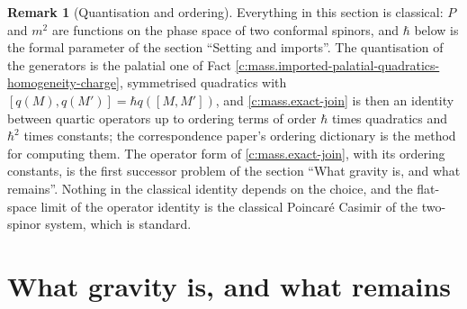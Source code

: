 \documentclass[11pt]{article}
\theoremstyle{definition}
\newtheorem{remark}[theorem]{Remark}
\theoremstyle{plain}
\newcommand{\changedmark}[2]{\marginpar{\raggedright\scriptsize\color{#1}#2}}
\begin{document}
\begin{remark}[Quantisation and ordering]\label{c:note.mass.quantisation-ordering}
\changedmark{gray}{reworded}
Everything in this section is classical: $P$ and $m^{2}$ are functions on the phase space of two conformal spinors, and $\hbar$ below is the formal parameter of the section ``Setting and imports''. The quantisation of the generators is the palatial one of Fact \ref{c:mass.imported-palatial-quadratics-homogeneity-charge}, symmetrised quadratics with $[q(M), q(M')] = \hbar q([M,M'])$, and \ref{c:mass.exact-join} is then an identity between quartic operators up to ordering terms of order $\hbar$ times quadratics and $\hbar^{2}$ times constants; the correspondence paper's ordering dictionary \cite[Thm.~5.7]{ButlerT9} is the method for computing them. The operator form of \ref{c:mass.exact-join}, with its ordering constants, is the first successor problem of the section ``What gravity is, and what remains''. Nothing in the classical identity depends on the choice, and the flat-space limit of the operator identity is the classical Poincar\'e Casimir of the two-spinor system, which is standard.
\end{remark}

\section{What gravity is, and what remains}
\end{document}
